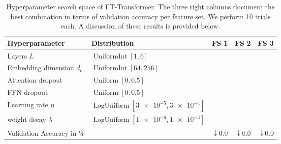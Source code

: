 \begin{table}[H]
    \centering
    \caption[Solutions of Hyperparameter Search Space of FT-Transformer]{Hyperparameter search space of FT-Transformer. The three right columns document the best combination in terms of validation accuracy per feature set. We perform \num{10} trials each. A discussion of these results is provided below.}
    \label{tab:solutions-transformer}
    \begin{tabular}{@{}llSSS@{}}
        \toprule
        Hyperparameter                       & Distribution                                        & {FS 1} & {FS 2} & {FS 3} \\ \midrule
        Layers $L$                           & $\operatorname{UniformInt}[1,6]$                    &        &        &        \\
        Embedding dimension $d_{\mathrm{e}}$ & $\operatorname{UniformInt}[64, 256]$                &        &        &        \\
        Attention dropout                    & $\operatorname{Uniform}[0, 0.5]$                    &        &        &        \\
        \gls{FFN} dropout                    & $\operatorname{Uniform}[0, 0.5]$                    &        &        &        \\
        Learning rate $\eta$                 & $\operatorname{LogUniform}[\num{3e-5}, \num{3e-4}]$ &        &        &        \\
        weight decay $\lambda$               & $\operatorname{LogUniform}[\num{1e-6}, \num{1e-3}]$ &        &        &        \\ \midrule
        Validation Accuracy in \%  &  & {$\downarrow \num{0.0}$} & {$\downarrow \num{0.0}$} & {$\downarrow \num{0.0}$} \\ \bottomrule
    \end{tabular}
\end{table}